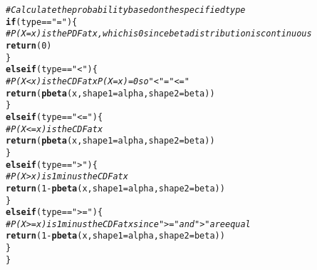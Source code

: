 \documentclass{article}\usepackage[]{graphicx}\usepackage[]{xcolor}
\makeatletter
\newcommand{\hlnum}[1]{\textcolor[rgb]{0.686,0.059,0.569}{#1}}%
\newcommand{\hlsng}[1]{\textcolor[rgb]{0.192,0.494,0.8}{#1}}%
\newcommand{\hlcom}[1]{\textcolor[rgb]{0.678,0.584,0.686}{\textit{#1}}}%
\newcommand{\hlopt}[1]{\textcolor[rgb]{0,0,0}{#1}}%
\newcommand{\hldef}[1]{\textcolor[rgb]{0.345,0.345,0.345}{#1}}%
\newcommand{\hlkwa}[1]{\textcolor[rgb]{0.161,0.373,0.58}{\textbf{#1}}}%
\newcommand{\hlkwc}[1]{\textcolor[rgb]{0.333,0.667,0.333}{#1}}%
\newcommand{\hlkwd}[1]{\textcolor[rgb]{0.737,0.353,0.396}{\textbf{#1}}}%
\newenvironment{kframe}{%
 \def\at@end@of@kframe{}%
 \ifinner\ifhmode%
  \def\at@end@of@kframe{\end{minipage}}%
  \begin{minipage}{\columnwidth}%
 \fi\fi%
 \def\FrameCommand##1{\hskip\@totalleftmargin \hskip-\fboxsep
 \colorbox{shadecolor}{##1}\hskip-\fboxsep
     \hskip-\linewidth \hskip-\@totalleftmargin \hskip\columnwidth}%
 \MakeFramed {\advance\hsize-\width
   \@totalleftmargin\z@ \linewidth\hsize
   \@setminipage}}%
 {\par\unskip\endMakeFramed%
 \at@end@of@kframe}
\newenvironment{knitrout}{}{} %
\makeatother
\begin{document}
\begin{enumerate}
\begin{knitrout}
\begin{kframe}
\begin{alltt}
  \hlcom{# Calculate the probability based on the specified type}
  \hlkwa{if} \hldef{(type} \hlopt{==} \hlsng{"="}\hldef{) \{}
    \hlcom{# P(X = x) is the PDF at x, which is 0 since beta distribution is continuous}
    \hlkwd{return}\hldef{(}\hlnum{0}\hldef{)}
  \hldef{\}}
  \hlkwa{else if} \hldef{(type} \hlopt{==} \hlsng{"<"}\hldef{) \{}
    \hlcom{# P(X < x) is the CDF at x P(X=x)=0 so "<" = "<="}
    \hlkwd{return}\hldef{(}\hlkwd{pbeta}\hldef{(x,} \hlkwc{shape1} \hldef{= alpha,} \hlkwc{shape2} \hldef{= beta))}
  \hldef{\}}
  \hlkwa{else if} \hldef{(type} \hlopt{==} \hlsng{"<="}\hldef{) \{}
    \hlcom{# P(X <= x) is the CDF at x}
    \hlkwd{return}\hldef{(}\hlkwd{pbeta}\hldef{(x,} \hlkwc{shape1} \hldef{= alpha,} \hlkwc{shape2} \hldef{= beta))}
  \hldef{\}}
  \hlkwa{else if} \hldef{(type} \hlopt{==} \hlsng{">"}\hldef{) \{}
    \hlcom{# P(X > x) is 1 minus the CDF at x}
    \hlkwd{return}\hldef{(}\hlnum{1} \hlopt{-} \hlkwd{pbeta}\hldef{(x,} \hlkwc{shape1} \hldef{= alpha,} \hlkwc{shape2} \hldef{= beta))}
  \hldef{\}}
  \hlkwa{else if} \hldef{(type} \hlopt{==} \hlsng{">="}\hldef{) \{}
    \hlcom{# P(X >= x) is 1 minus the CDF at x since ">=" and ">" are equal}
    \hlkwd{return}\hldef{(}\hlnum{1} \hlopt{-} \hlkwd{pbeta}\hldef{(x,} \hlkwc{shape1} \hldef{= alpha,} \hlkwc{shape2} \hldef{= beta))}
  \hldef{\}}
\hldef{\}}
\end{alltt}
\end{kframe}
\end{knitrout}
\end{enumerate}

\end{document}
